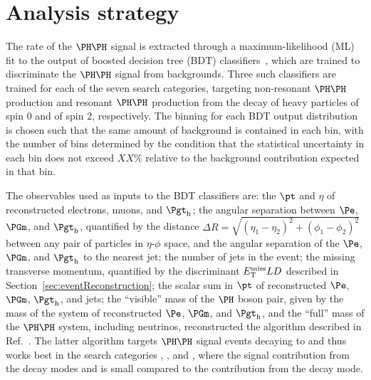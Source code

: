 \section{Analysis strategy}
\label{sec:analysisStrategy}

The rate of the $\HH$ signal is extracted through a maximum-likelihood (ML) fit to
the output of boosted decision tree (BDT) classifiers~\cite{Breiman:1984jka},
which are trained to discriminate the $\HH$ signal from backgrounds.
Three such classifiers are trained for each of the seven search categories,
targeting non-resonant $\HH$ production and resonant $\HH$ production from
the decay of heavy particles of spin $0$ and of spin $2$, respectively.
The binning for each BDT output distribution is chosen such that the same
amount of background is contained in each bin, with the number of bins
determined by the condition that the statistical uncertainty in each bin does
not exceed $XX\%$ relative to the background contribution expected in that bin.

The observables used as inputs to the BDT classifiers are:
the $\pt$ and $\eta$ of reconstructed electrons, muons, and $\tauh$;
the angular separation between $\Pe$, $\PGm$, and $\tauh$,
quantified by the distance $\Delta R = \sqrt{(\eta_{1} - \eta_{2})^{2} + (\phi_{1} - \phi_{2})^{2}}$ between any pair of particles in $\eta$-$\phi$ space,
and the angular separation of the $\Pe$, $\PGm$, and $\tauh$ to the nearest jet;
the number of jets in the event;
the missing transverse momentum, quantified by the discriminant $E_{\mathrm{T}}^\text{miss} LD$ described in Section~\ref{sec:eventReconstruction};
the scalar sum in $\pt$ of reconstructed $\Pe$, $\PGm$, $\tauh$, and jets;
the ``visible'' mass of the $\PHiggs$ boson pair, given by the mass of the system of reconstructed $\Pe$, $\PGm$, and $\tauh$,
and the ``full'' mass of the $\HH$ system, including neutrinos, reconstructed the algorithm described in Ref.~\cite{Ehataht:2018nql}.
The latter algorithm targets $\HH$ signal events decaying to \tttt and thus works best in the search categories \zeroLeptonFourTau, \oneLeptonThreeTau, and \twoLeptonTwoTau,
where the signal contribution from the decay modes \WWWW and \WWtt is small compared to the contribution from the \tttt decay mode.

